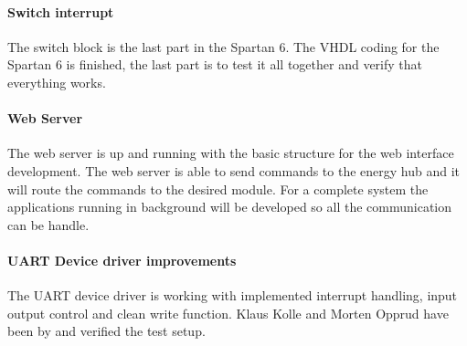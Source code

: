 \paragraph{Switch interrupt}
The switch block is the last part in the Spartan 6. The VHDL coding for the Spartan 6 is finished, the last part is to test it all together and verify that everything works.
%
%
\paragraph{Web Server}
The web server is up and running with the basic structure for the web interface development. The web server is able to send commands to the energy hub and it will route the commands to the desired module. For a complete system the applications running in background will be developed so all the communication can be handle.
%
%
\paragraph{UART Device driver improvements}
The UART device driver is working with implemented interrupt handling, input output control and clean write function. Klaus Kolle and Morten Opprud have been by and verified the test setup. 
%
%